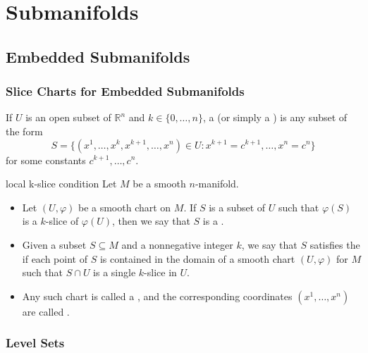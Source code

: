 \documentclass[../main.tex]{subfiles}
\begin{document}
\ifSubfilesClassLoaded{

    \tableofcontents
    
}{}

\chapter{ Submanifolds }
\section{Embedded Submanifolds}


\subsection{Slice Charts for Embedded Submanifolds}
\begin{definition}{}{}
     If $U$ is an open subset of $\mathbb{R}^n$ and $k \in \{0, \dots, n\}$, a  (or simply a ) is any subset of the form
$$S = \{(x^1, \dots, x^k, x^{k+1}, \dots, x^n) \in U : x^{k+1} = c^{k+1}, \dots, x^n = c^n\}$$
for some constants $c^{k+1}, \dots, c^n$. 
\end{definition}

\begin{definition}{local k-slice condition}{}
    Let $M$ be a smooth $n$-manifold.  \begin{itemize}
        \item Let $(U,\varphi)$ be a smooth chart on $M$. If $S$ is a subset of $U$ such that $\varphi(S)$ is a $k$-slice of $\varphi(U)$, then we say that $S$ is a .
        \item  Given a subset $S \subseteq M$ and a nonnegative integer $k$, we say that $S$ satisfies the  if each point of $S$ is contained in the domain of a smooth chart $(U,\varphi)$ for $M$ such that $S \cap U$ is a single $k$-slice in $U$.
        \item Any such chart is called a , and the corresponding coordinates $(x^1,\dots,x^n)$ are called .
    \end{itemize}
     
\end{definition}
\subsection{Level Sets}
\end{document}
